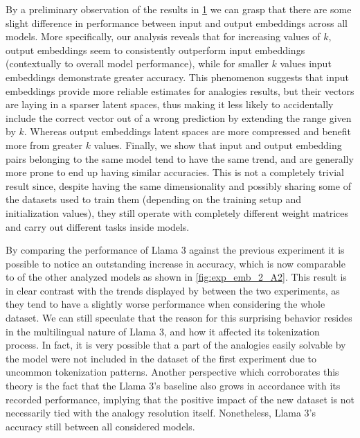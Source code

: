 By a preliminary observation of the results in \cref{fig:exp_emb_2_A} we can grasp that there are some slight difference in performance between input and output embeddings across all models.
More specifically, our analysis reveals that for increasing values of $k$, output embeddings seem to consistently outperform input embeddings (contextually to overall model performance), while for smaller $k$ values input embeddings demonstrate greater accuracy.
This phenomenon suggests that input embeddings provide more reliable estimates for analogies results, but their vectors are laying in a sparser latent spaces, thus making it less likely to accidentally include the correct vector out of a wrong prediction by extending the range given by $k$.
Whereas output embeddings latent spaces are more compressed and benefit more from greater $k$ values.
Finally, we show that input and output embedding pairs belonging to the same model tend to have the same trend, and are generally more prone to end up having similar accuracies.
This is not a completely trivial result since, despite having the same dimensionality and possibly sharing some of the datasets used to train them (depending on the training setup and initialization values), they still operate with completely different weight matrices and carry out different tasks inside models.

\begin{figure}[t!]
    \centering
    \caption{}
    \label{fig:exp_emb_2_A}
\end{figure}

By comparing the performance of Llama 3 against the previous experiment it is possible to notice an outstanding increase in accuracy, which is now comparable to  of the other analyzed models as shown in \cref{fig:exp_emb_2_A2}.
This result is in clear contrast with the trends displayed by  between the two experiments, as they tend to have a slightly worse performance when considering the whole dataset.
We can still speculate that the reason for this surprising behavior resides in the multilingual nature of Llama 3, and how it affected its tokenization process.
In fact, it is very possible that a part of the analogies easily solvable by the model were not included in the dataset of the first experiment due to uncommon tokenization patterns.
Another perspective which corroborates this theory is the fact that the Llama 3's baseline also grows in accordance with its recorded performance, implying that the positive impact of the new dataset is not necessarily tied with the analogy resolution  itself.
Nonetheless, Llama 3's accuracy still  between all considered models. 

